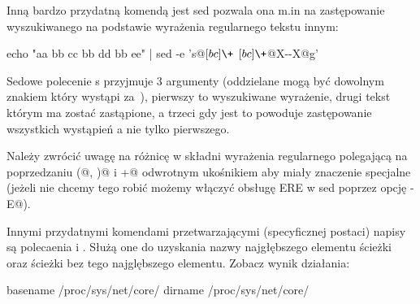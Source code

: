 Inną bardzo przydatną komendą jest sed pozwala ona m.in na zastępowanie
wyszukiwanego na podstawie wyrażenia regularnego tekstu innym:

\begin{CodeFrame*}[bash]{}
echo "aa bb cc bb dd bb ee" | sed -e 's@\([bc]\+\) \([bc]\+\)@X-\2-X@g'
\end{CodeFrame*}

Sedowe polecenie s przyjmuje 3 argumenty (oddzielane mogą być dowolnym znakiem który wystąpi za~\Verb@s@),
pierwszy to wyszukiwane wyrażenie, drugi tekst którym ma zostać zastąpione,
a trzeci gdy jest \Verb@g@ to powoduje zastępowanie wszystkich wystąpień a nie tylko pierwszego.

Należy zwrócić uwagę na różnicę w składni wyrażenia regularnego polegającą na poprzedzaniu
\Verb@(@, \Verb@)@ i \Verb@+@ odwrotnym ukośnikiem aby miały znaczenie specjalne
(jeżeli nie chcemy tego robić możemy włączyć obsługę ERE w sed poprzez opcję \Verb@-E@).

Innymi przydatnymi komendami przetwarzającymi (specyficznej postaci) napisy są polecaenia \Verb@basename@ i \Verb@dirname@.
Służą one do uzyskania nazwy najgłębszego elementu ścieżki oraz ścieżki bez tego najglębszego elementu. Zobacz wynik działania:

\begin{CodeFrame*}[bash]{}
basename /proc/sys/net/core/
dirname /proc/sys/net/core/
\end{CodeFrame*}
